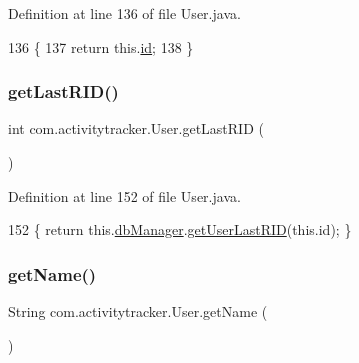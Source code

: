 Definition at line 136 of file User.\+java.


\begin{DoxyCode}
136                        \{
137         \textcolor{keywordflow}{return} this.\mbox{\hyperlink{classcom_1_1activitytracker_1_1_user_adc05319380c2cbb37477ab5aab86317c}{id}};
138     \}
\end{DoxyCode}
\mbox{\label{classcom_1_1activitytracker_1_1_user_a7040d0d696d79f9592eec6ac507de3c7}} 
\subsubsection{\texorpdfstring{get\+Last\+R\+I\+D()}{getLastRID()}}
{\footnotesize\ttfamily int com.\+activitytracker.\+User.\+get\+Last\+R\+ID (\begin{DoxyParamCaption}{ }\end{DoxyParamCaption})}



Definition at line 152 of file User.\+java.


\begin{DoxyCode}
152 \{ \textcolor{keywordflow}{return} this.\mbox{\hyperlink{classcom_1_1activitytracker_1_1_user_a8c8b36433447a235f2b4940b92e839c1}{dbManager}}.\mbox{\hyperlink{classcom_1_1activitytracker_1_1_d_b_manager_aab14c61b3f3a17bdea10cab1b5fd9337}{getUserLastRID}}(this.\textcolor{keywordtype}{id}); \}
\end{DoxyCode}
\mbox{\label{classcom_1_1activitytracker_1_1_user_a6b39e49a1e49279035fd61a667d14f64}} 
\subsubsection{\texorpdfstring{get\+Name()}{getName()}}
{\footnotesize\ttfamily String com.\+activitytracker.\+User.\+get\+Name (\begin{DoxyParamCaption}{ }\end{DoxyParamCaption})}



